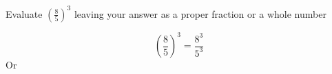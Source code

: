 \question Evaluate $\left( \frac{8}{5} \right)^{3}$ leaving your answer as a
proper fraction or a whole number
\begin{solution}
	\[
		\left( \frac{8}{5} \right)^{3} 
		=
		\frac{8^{3}}{5^{3}} 
	\]
	Or
\end{solution}

